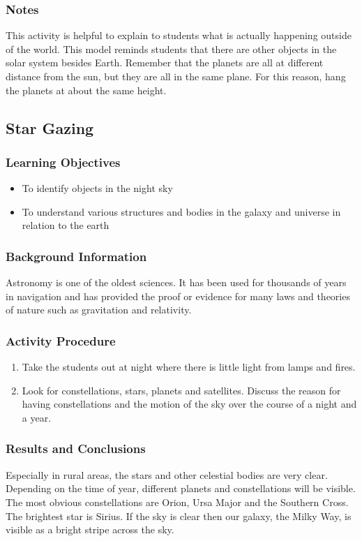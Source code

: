 \subsubsection*{Notes}
This activity is helpful to explain to students what is actually
happening outside of the world. This model reminds students that there are other objects in the solar system besides Earth. Remember that the planets are all at different distance from the sun, but they are all in the same plane. For this reason, hang the planets at about the same height.

\subsection{Star Gazing}

\subsubsection*{Learning Objectives}
\begin{itemize}
\item{To identify objects in the night sky}
\item{To understand various structures and bodies in the galaxy and universe in relation to the earth}
\end{itemize}

\subsubsection*{Background Information}
Astronomy is one of the oldest sciences. It has been used for thousands of years in navigation and has provided the proof or evidence for many laws and theories of nature such as gravitation and relativity.

\subsubsection*{Activity Procedure}
\begin{enumerate}
\item{Take the students out at night where there is little light from lamps and fires.}
\item{Look for constellations, stars, planets and satellites. Discuss the reason for having constellations and the motion of the sky over the course of a night and a year.}
\end{enumerate}

\subsubsection*{Results and Conclusions}
Especially in rural areas, the stars and other celestial bodies are very clear. Depending on the time of year, different planets and constellations will be visible. The most obvious constellations are Orion, Ursa Major and the Southern Cross. The brightest star is Sirius. If the sky is clear then our galaxy, the Milky Way, is visible as a bright stripe across the sky.

